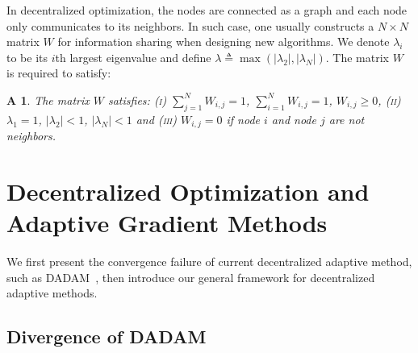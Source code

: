 \documentclass[anon,12pt]{colt2021} %
\newtheorem{assumptionA}{A\!\!}
\begin{document}
In decentralized optimization, the nodes are connected as a graph and each node only communicates to its neighbors. 
In such case, one usually constructs a $N \times N$ matrix $W$ for information sharing when designing new algorithms. 
We denote $\lambda_i$ to be its $i$th largest eigenvalue and define $\lambda \triangleq \max (|\lambda_2|,|\lambda_N|)$.
The matrix $W$ is required to satisfy:
\begin{assumptionA}\label{a:matrixW}
The matrix $W$ satisfies: \textsc{(i)} $\sum_{j=1}^N W_{i,j} = 1$,  $\sum_{i=1}^N W_{i,j} = 1$, $W_{i,j} \geq 0$, \textsc{(ii)} $\lambda_1 = 1$, $|\lambda_2| < 1$, $|\lambda_N| < 1 $ and \textsc{(iii)} $W_{i,j} = 0 $ if node $i$ and node $j$ are not neighbors.
\end{assumptionA}



\vspace{-0.05in}
\section{Decentralized Optimization and Adaptive Gradient Methods}\label{sec:dadam}
\vspace{-0.05in}

 We first present the convergence failure of current decentralized adaptive method, such as DADAM~\cite{nazari2019dadam}, then introduce our general framework for decentralized adaptive methods.
 
 
\subsection{Divergence of DADAM}\label{sec:divergence}
\end{document}
